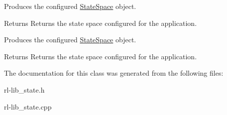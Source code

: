 Produces the configured \hyperlink{classStateSpace}{State\-Space} object. 

\begin{DoxyReturn}{Returns}
Returns the state space configured for the application.
\end{DoxyReturn}
Produces the configured \hyperlink{classStateSpace}{State\-Space} object. \begin{DoxyReturn}{Returns}
Returns the state space configured for the application. 
\end{DoxyReturn}


The documentation for this class was generated from the following files\-:\begin{DoxyCompactItemize}
\item 
rl-\/lib\-\_\-state.\-h\item 
rl-\/lib\-\_\-state.\-cpp\end{DoxyCompactItemize}
